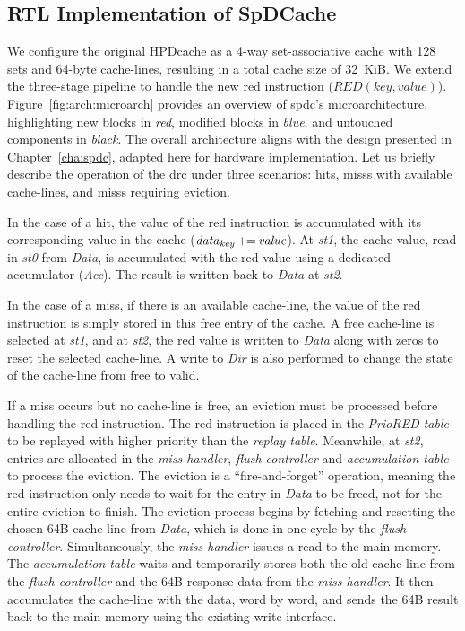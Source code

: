 \subsection{RTL Implementation of SpDCache}
\label{sec:arch:spdcache}

We configure the original HPDcache as a 4-way \gls{set}-associative cache with 128 \glspl{set} and 64-byte cache-lines, resulting in a total cache size of 32~KiB.
We extend the three-stage \gls{pipeline} to handle the new \acrshort{red} instruction ($\mathit{RED}(key, value)$).
Figure~\ref{fig:arch:microarch} provides an overview of \acrlong{spdc}'s microarchitecture, highlighting new blocks in \textit{red}, modified blocks in \textit{blue}, and untouched components in \textit{black}.
The overall architecture aligns with the design presented in Chapter~\ref{cha:spdc}, adapted here for hardware implementation.
Let us briefly describe the operation of the \acrshort{drc} under three scenarios: \glspl{hit}, \glspl{miss} with available cache-lines, and \glspl{miss} requiring \gls{eviction}.

In the case of a \gls{hit}, the value of the \acrshort{red} instruction is accumulated with its corresponding value in the cache ($\mathit{data}_\mathit{key} \mathit{\,+\!\!=\,} \mathit{value}$).
At \textit{st1}, the cache value, read in \textit{st0} from \textit{Data}, is accumulated with the \acrshort{red} value using a dedicated accumulator (\textit{Acc}).
The result is written back to \textit{Data} at \textit{st2}.

In the case of a \gls{miss}, if there is an available cache-line, the value of the \acrshort{red} instruction is simply stored in this free entry of the cache.
A free cache-line is selected at \textit{st1}, and at \textit{st2}, the \acrshort{red} value is written to \textit{Data} along with zeros to reset the selected cache-line.
A write to \textit{Dir} is also performed to change the state of the cache-line from free to valid.

If a \gls{miss} occurs but no cache-line is free, an \gls{eviction} must be processed before handling the \acrshort{red} instruction.
The \acrshort{red} instruction is placed in the \textit{PrioRED table} to be replayed with higher priority than the \textit{replay table}.
Meanwhile, at \textit{st2}, entries are allocated in the \textit{miss handler}, \textit{flush controller} and \textit{accumulation table} to process the \gls{eviction}.
The \gls{eviction} is a ``fire-and-forget'' operation, meaning the \acrshort{red} instruction only needs to wait for the entry in \textit{Data} to be freed, not for the entire \gls{eviction} to finish.
The \gls{eviction} process begins by fetching and resetting the chosen 64B cache-line from \textit{Data}, which is done in one cycle by the \textit{flush controller}.
Simultaneously, the \textit{miss handler} issues a read to the main memory.
The \textit{accumulation table} waits and temporarily stores both the old cache-line from the \textit{flush controller} and the 64B response data from the \textit{miss handler}.
It then accumulates the cache-line with the data, word by word, and sends the 64B result back to the main memory using the existing write interface.

